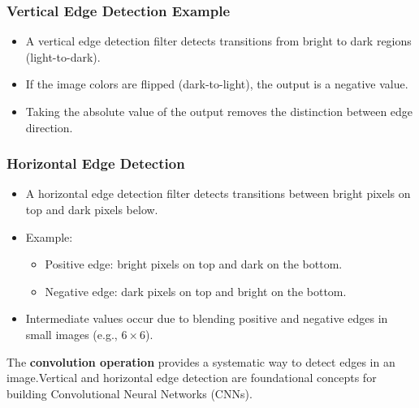 \documentclass[letterpaper,12pt,notitlepage,twoside]{report}
\begin{document}
\subsubsection{Vertical Edge Detection Example}
\begin{itemize}[nosep]
    \item A vertical edge detection filter detects transitions from bright to dark regions (light-to-dark).
    \item If the image colors are flipped (dark-to-light), the output is a negative value.
    \item Taking the absolute value of the output removes the distinction between edge direction.
\end{itemize}

\subsubsection{Horizontal Edge Detection}
\begin{itemize}[nosep]
    \item A horizontal edge detection filter detects transitions between bright pixels on top and dark pixels below.
    \item Example:
    \begin{itemize}
        \item Positive edge: bright pixels on top and dark on the bottom.
        \item Negative edge: dark pixels on top and bright on the bottom.
    \end{itemize}
    \item Intermediate values occur due to blending positive and negative edges in small images (e.g., $6 \times 6$).
\end{itemize}
The \textbf{convolution operation} provides a systematic way to detect edges in an image.Vertical and horizontal edge detection are foundational concepts for building Convolutional Neural Networks (CNNs).
\end{document}

